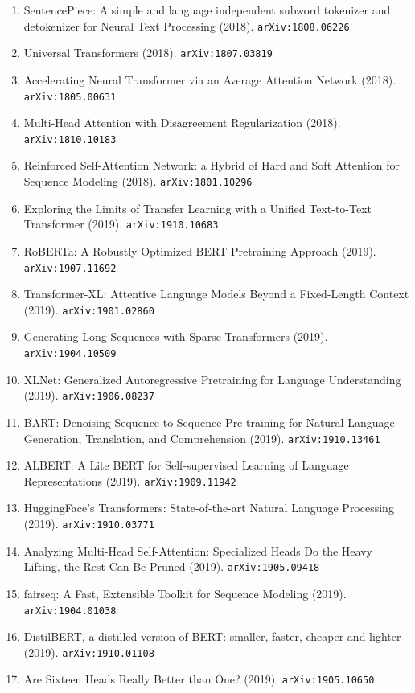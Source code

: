 \documentclass[11pt]{article}
\begin{document}
\begin{enumerate}
  Challenge (2018). \texttt{arXiv:1803.05457}
  \item SentencePiece: A simple and language independent subword tokenizer and
  detokenizer for Neural Text Processing (2018). \texttt{arXiv:1808.06226}
  \item Universal Transformers (2018). \texttt{arXiv:1807.03819}
  \item Accelerating Neural Transformer via an Average Attention Network (2018). \texttt{arXiv:1805.00631}
  \item Multi-Head Attention with Disagreement Regularization (2018). \texttt{arXiv:1810.10183}
  \item Reinforced Self-Attention Network: a Hybrid of Hard and Soft Attention
  for Sequence Modeling (2018). \texttt{arXiv:1801.10296}
  \item Exploring the Limits of Transfer Learning with a Unified Text-to-Text
  Transformer (2019). \texttt{arXiv:1910.10683}
  \item RoBERTa: A Robustly Optimized BERT Pretraining Approach (2019). \texttt{arXiv:1907.11692}
  \item Transformer-XL: Attentive Language Models Beyond a Fixed-Length Context (2019). \texttt{arXiv:1901.02860}
  \item Generating Long Sequences with Sparse Transformers (2019). \texttt{arXiv:1904.10509}
  \item XLNet: Generalized Autoregressive Pretraining for Language Understanding (2019). \texttt{arXiv:1906.08237}
  \item BART: Denoising Sequence-to-Sequence Pre-training for Natural Language
  Generation, Translation, and Comprehension (2019). \texttt{arXiv:1910.13461}
  \item ALBERT: A Lite BERT for Self-supervised Learning of Language
  Representations (2019). \texttt{arXiv:1909.11942}
  \item HuggingFace's Transformers: State-of-the-art Natural Language Processing (2019). \texttt{arXiv:1910.03771}
  \item Analyzing Multi-Head Self-Attention: Specialized Heads Do the Heavy
  Lifting, the Rest Can Be Pruned (2019). \texttt{arXiv:1905.09418}
  \item fairseq: A Fast, Extensible Toolkit for Sequence Modeling (2019). \texttt{arXiv:1904.01038}
  \item DistilBERT, a distilled version of BERT: smaller, faster, cheaper and
  lighter (2019). \texttt{arXiv:1910.01108}
  \item Are Sixteen Heads Really Better than One? (2019). \texttt{arXiv:1905.10650}

\end{enumerate}
\end{document}
